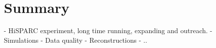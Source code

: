\chapter{Summary}
\label{ch:summary}

- HiSPARC experiment, long time running, expanding and outreach.
- Simulations
- Data quality
- Reconstructions
- ..
